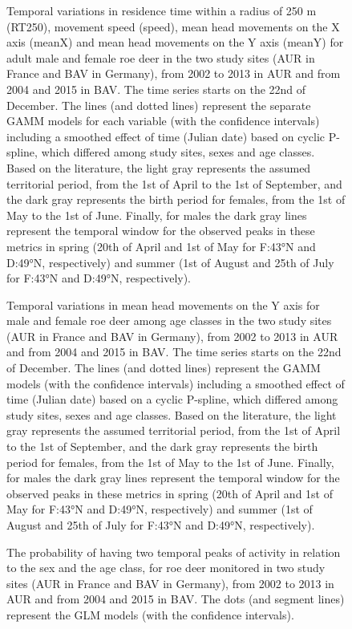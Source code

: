 \documentclass[a4paper,11pt]{article}
\begin{document}
\begin{figure} [!h]
\centering
\caption{Temporal variations in residence time within a radius of 250 m (RT250), movement speed (speed), mean head movements on the X axis (meanX) and mean head movements on the Y axis (meanY) for adult male and female roe deer in the two study sites (AUR in France and BAV in Germany), from 2002 to 2013 in AUR and from 2004 and 2015 in BAV. The time series starts on the 22nd of December. The lines (and dotted lines) represent the separate GAMM models for each variable (with the confidence intervals) including a smoothed effect of time (Julian date) based on cyclic P-spline, which differed among study sites, sexes and age classes. Based on the literature, the light gray represents the assumed territorial period, from the 1st of April to the 1st of September, and the dark gray represents the birth period for females, from the 1st of May to the 1st of June. Finally, for males the dark gray lines represent the temporal window for the observed peaks in these metrics in spring (20th of April and 1st of May for F:43°N and D:49°N, respectively) and summer (1st of August and 25th of July for F:43°N and D:49°N, respectively).}
\end{figure}

\begin{figure} [!h]
\centering
\caption{Temporal variations in mean head movements on the Y axis for male and female roe deer among age classes in the two study sites (AUR in France and BAV in Germany), from 2002 to 2013 in AUR and from 2004 and 2015 in BAV. The time series starts on the 22nd of December. The lines (and dotted lines) represent the GAMM models (with the confidence intervals) including a smoothed effect of time (Julian date) based on a cyclic P-spline, which differed among study sites, sexes and age classes. Based on the literature, the light gray represents the assumed territorial period, from the 1st of April to the 1st of September, and the dark gray represents the birth period for females, from the 1st of May to the 1st of June. Finally, for males the dark gray lines represent the temporal window for the observed peaks in these metrics in spring (20th of April and 1st of May for F:43°N and D:49°N, respectively) and summer (1st of August and 25th of July for F:43°N and D:49°N, respectively).}
\end{figure}

\begin{figure} [!h]
\centering
\caption{The probability of having two temporal peaks of activity in relation to the sex and the age class, for roe deer monitored in two study sites (AUR in France and BAV in Germany), from 2002 to 2013 in AUR and from 2004 and 2015 in BAV. The dots (and segment lines) represent the GLM models (with the confidence intervals).}
\end{figure}
\end{document}
